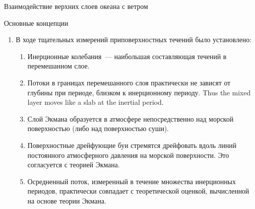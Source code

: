 \begin{chapter}{Взаимодействие верхних слоев океана с ветром}
\begin{section}{Основные концепции}
\begin{enumerate}
\begin{enumerate}
\item 
\textit{Поверхностная скорость}: $1$--$2.5\%$~скорости ветра в зависимости
от широты.
%

\item 
\textit{Глубина}: приблизительно~$40$--$300\m$ в зависимости от широты
и скорости ветра.
%
\end{enumerate}

\item 
В ходе тщательных измерений приповерхностных течений было установлено:
%
%
  \begin{enumerate}
   \item 
    Инерционные колебания~--- наибольшая составляющая течений
    в перемешанном слое.
%

   \item Потоки в границах перемешанного 
    слоя практически не зависят 
    от глубины при периоде, близком к инерционному 
    периоду. Thus the mixed layer moves
    like a slab at the inertial period.
%

   \item Слой Экмана образуется в атмосфере непосредственно над морской 
    поверхностью (либо над поверхностью суши).
%

   \item Поверхностные дрейфующие буи 
    стремятся дрейфовать вдоль линий постоянного атмосферного давления
    на морской поверхности. Это согласуется с теорией Экмана.
%

   \item Осредненный поток, измеренный в течение множества инерционных периодов,
    практически совпадает с теоретической оценкой, вычисленной на основе
    теории Экмана.
%
\end{enumerate}


\end{enumerate}
\end{section}
\end{chapter}
